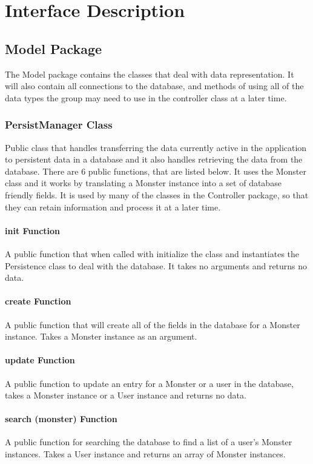\documentclass[titlepage]{article}
\begin{document}
\section {Interface Description}

\subsection{Model Package}
The Model package contains the classes that deal with data representation. It will also contain all connections to the database, and methods of using all of the data types the group may need to use in the controller class at a later time.

\subsubsection{PersistManager Class}
Public class that handles transferring the data currently active in the application to persistent data in a database and it also handles retrieving the data from the database. There are 6 public functions, that are listed below. It uses the Monster class and it works by translating a Monster instance into a set of database friendly fields. It is used by many of the classes in the Controller package, so that they can retain information and process it at a later time.

\paragraph{init Function}
A public function that when called with initialize the class and instantiates the Persistence class to deal with the database. It takes no arguments and returns no data.

\paragraph{create Function}
A public function that will create all of the fields in the database for a Monster instance. Takes a Monster instance as an argument.

\paragraph{update Function}
A public function to update an entry for a Monster or a user in the database, takes a Monster instance or a User instance and returns no data.

\paragraph{search (monster) Function}
A public function for searching the database to find a list of a user's Monster instances. Takes a User instance and returns an array of Monster instances.
\end{document}
